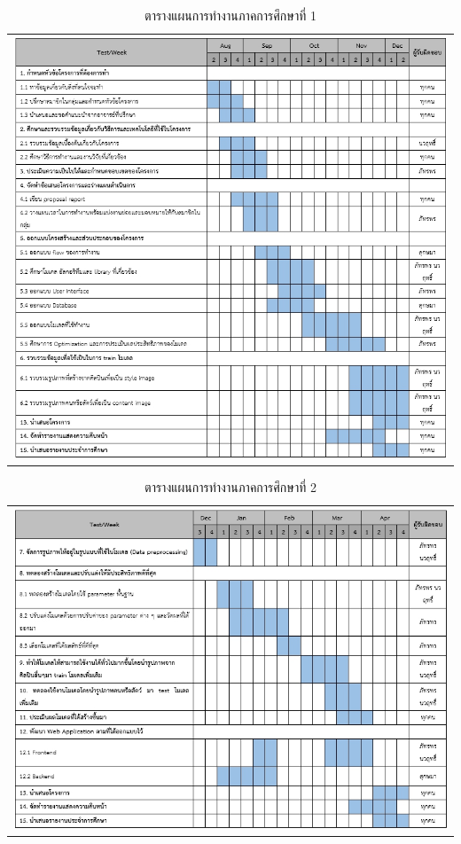 \documentclass[12pt,oneside,openright,a4paper]{cpe-thai-project}
\begin{document}
\newpage

\begin{table}[!h]
  \centering
  \begin{tabular}{c}
  \hfill
  \includegraphics[width=15cm]{./image/plan_table1.jpg}
  \hfill
  \end{tabular}
\caption{ตารางแผนการทำงานภาคการศึกษาที่ 1\centering}
\label{tbl:plan1}
\end{table}

\newpage

\begin{table}[!h]
  \centering
  \begin{tabular}{c}
  \hfill
  \includegraphics[width=15cm]{./image/plan_table2.jpg}
  \hfill
  \end{tabular}
\caption{ตารางแผนการทำงานภาคการศึกษาที่ 2\centering}
\label{tbl:plan2}
\end{table}
\end{document}
